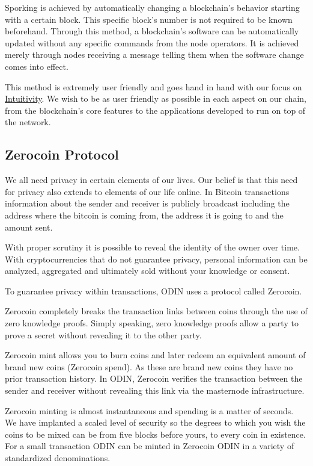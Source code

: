 \documentclass[12pt,letterpaper]{article}
\begin{document}
Sporking is achieved by automatically changing a blockchain's behavior starting with a certain block. This specific block's number is not required to be known beforehand. Through this method, a blockchain's software can be automatically updated without any specific commands from the node operators. It is achieved merely through nodes receiving a message telling them when the software change comes into effect.

This method is extremely user friendly and goes hand in hand with our focus on \href{https://odinblockchain.org/#intuitive}{Intuitivity}. We wish to be as user friendly as possible in each aspect on our chain, from the blockchain's core features to the applications developed to run on top of the network.

\subsection{Zerocoin Protocol}
We all need privacy in certain elements of our lives.  Our belief is that this need for privacy also extends to elements of our life online.  In Bitcoin transactions information about the sender and receiver is publicly broadcast including the address where the bitcoin is coming from, the address it is going to and the amount sent. 

With proper scrutiny it is possible to reveal the identity of the owner over time. With cryptocurrencies that do not guarantee privacy, personal information can be analyzed, aggregated and ultimately sold without your knowledge or consent.

To guarantee privacy within transactions, ODIN uses a protocol called Zerocoin.  

Zerocoin completely breaks the transaction links between coins through the use of zero knowledge proofs. Simply speaking, zero knowledge proofs allow a party to prove a secret without revealing it to the other party.

Zerocoin mint allows you to burn coins and later redeem an equivalent amount of brand new coins (Zerocoin spend).  As these are brand new coins they have no prior transaction history.  In ODIN, Zerocoin verifies the transaction between the sender and receiver without revealing this link via the masternode infrastructure.  

Zerocoin minting is almost instantaneous and spending is a matter of seconds.
We have implanted a scaled level of security so the degrees to which you wish the coins to be mixed can be from five blocks before yours, to every coin in existence. For a small transaction ODIN can be minted in Zerocoin ODIN in a variety of standardized denominations.
\end{document}
